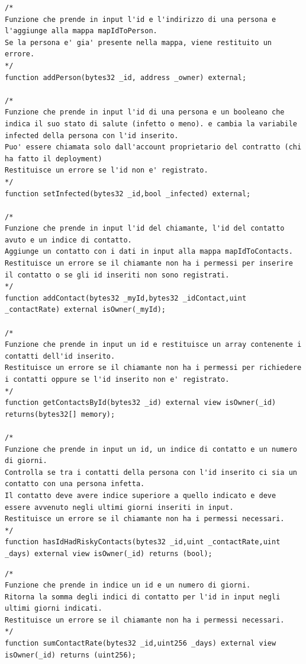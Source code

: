 \mbox{\newline}
\begin{lstlisting}[language=Solidity]
/*
Funzione che prende in input l'id e l'indirizzo di una persona e l'aggiunge alla mappa mapIdToPerson.
Se la persona e' gia' presente nella mappa, viene restituito un errore.
*/
function addPerson(bytes32 _id, address _owner) external;

/*
Funzione che prende in input l'id di una persona e un booleano che indica il suo stato di salute (infetto o meno). e cambia la variabile infected della persona con l'id inserito. 
Puo' essere chiamata solo dall'account proprietario del contratto (chi ha fatto il deployment)
Restituisce un errore se l'id non e' registrato.
*/    
function setInfected(bytes32 _id,bool _infected) external;

/*
Funzione che prende in input l'id del chiamante, l'id del contatto avuto e un indice di contatto.
Aggiunge un contatto con i dati in input alla mappa mapIdToContacts.
Restituisce un errore se il chiamante non ha i permessi per inserire il contatto o se gli id inseriti non sono registrati.
*/    
function addContact(bytes32 _myId,bytes32 _idContact,uint _contactRate) external isOwner(_myId);

/*
Funzione che prende in input un id e restituisce un array contenente i contatti dell'id inserito.
Restituisce un errore se il chiamante non ha i permessi per richiedere i contatti oppure se l'id inserito non e' registrato.
*/    
function getContactsById(bytes32 _id) external view isOwner(_id) returns(bytes32[] memory);

/*
Funzione che prende in input un id, un indice di contatto e un numero di giorni.
Controlla se tra i contatti della persona con l'id inserito ci sia un contatto con una persona infetta.
Il contatto deve avere indice superiore a quello indicato e deve essere avvenuto negli ultimi giorni inseriti in input.
Restituisce un errore se il chiamante non ha i permessi necessari.
*/    
function hasIdHadRiskyContacts(bytes32 _id,uint _contactRate,uint _days) external view isOwner(_id) returns (bool);

\end{lstlisting}
\newpage
\begin{lstlisting}[language=Solidity]
/*
Funzione che prende in indice un id e un numero di giorni.
Ritorna la somma degli indici di contatto per l'id in input negli ultimi giorni indicati.
Restituisce un errore se il chiamante non ha i permessi necessari.
*/   
function sumContactRate(bytes32 _id,uint256 _days) external view isOwner(_id) returns (uint256);

\end{lstlisting}

